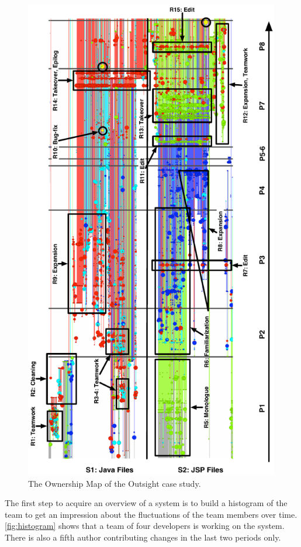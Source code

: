 \begin{figure}[htbp]
\begin{center}
\includegraphics[height=21.3cm]{fig/chronia-outsight}
\caption{The Ownership Map of the Outsight case study.}
\label{fig:casestudy-outsight}
\end{center}
\end{figure}

The first step to acquire an overview of a system is to build a histogram of the team to get an impression about the fluctuations of the team members over time. \autoref{fig:histogram} shows that a team of four developers is working on the system. There is also a fifth author contributing changes in the last two periods only.



